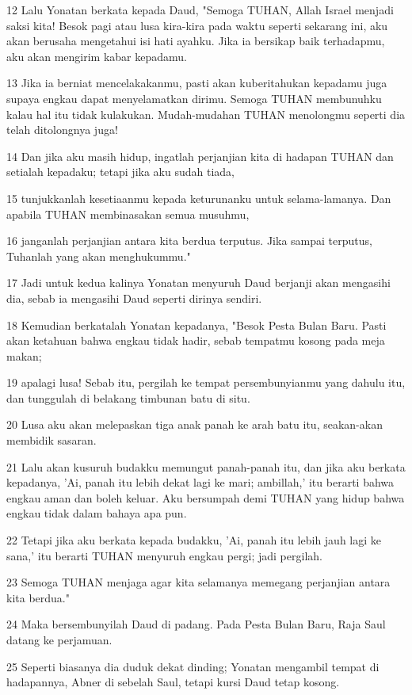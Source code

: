 \par 12 Lalu Yonatan berkata kepada Daud, "Semoga TUHAN, Allah Israel menjadi saksi kita! Besok pagi atau lusa kira-kira pada waktu seperti sekarang ini, aku akan berusaha mengetahui isi hati ayahku. Jika ia bersikap baik terhadapmu, aku akan mengirim kabar kepadamu.
\par 13 Jika ia berniat mencelakakanmu, pasti akan kuberitahukan kepadamu juga supaya engkau dapat menyelamatkan dirimu. Semoga TUHAN membunuhku kalau hal itu tidak kulakukan. Mudah-mudahan TUHAN menolongmu seperti dia telah ditolongnya juga!
\par 14 Dan jika aku masih hidup, ingatlah perjanjian kita di hadapan TUHAN dan setialah kepadaku; tetapi jika aku sudah tiada,
\par 15 tunjukkanlah kesetiaanmu kepada keturunanku untuk selama-lamanya. Dan apabila TUHAN membinasakan semua musuhmu,
\par 16 janganlah perjanjian antara kita berdua terputus. Jika sampai terputus, Tuhanlah yang akan menghukummu."
\par 17 Jadi untuk kedua kalinya Yonatan menyuruh Daud berjanji akan mengasihi dia, sebab ia mengasihi Daud seperti dirinya sendiri.
\par 18 Kemudian berkatalah Yonatan kepadanya, "Besok Pesta Bulan Baru. Pasti akan ketahuan bahwa engkau tidak hadir, sebab tempatmu kosong pada meja makan;
\par 19 apalagi lusa! Sebab itu, pergilah ke tempat persembunyianmu yang dahulu itu, dan tunggulah di belakang timbunan batu di situ.
\par 20 Lusa aku akan melepaskan tiga anak panah ke arah batu itu, seakan-akan membidik sasaran.
\par 21 Lalu akan kusuruh budakku memungut panah-panah itu, dan jika aku berkata kepadanya, 'Ai, panah itu lebih dekat lagi ke mari; ambillah,' itu berarti bahwa engkau aman dan boleh keluar. Aku bersumpah demi TUHAN yang hidup bahwa engkau tidak dalam bahaya apa pun.
\par 22 Tetapi jika aku berkata kepada budakku, 'Ai, panah itu lebih jauh lagi ke sana,' itu berarti TUHAN menyuruh engkau pergi; jadi pergilah.
\par 23 Semoga TUHAN menjaga agar kita selamanya memegang perjanjian antara kita berdua."
\par 24 Maka bersembunyilah Daud di padang. Pada Pesta Bulan Baru, Raja Saul datang ke perjamuan.
\par 25 Seperti biasanya dia duduk dekat dinding; Yonatan mengambil tempat di hadapannya, Abner di sebelah Saul, tetapi kursi Daud tetap kosong.
